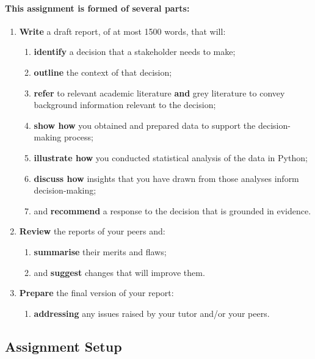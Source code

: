 \documentclass{../../fal_assignment}
\begin{document}
\paragraph{
This assignment is formed of several parts:
}

\begin{enumerate}[label=(\Alph*)]
    \item \textbf{Write} a draft report, of at most 1500 words, that will:
    	\begin{enumerate}[label=(\roman*)]
    		\item \textbf{identify} a decision that a stakeholder needs to make;
    		\item \textbf{outline} the context of that decision;
    		\item \textbf{refer} to relevant academic literature \textbf{and} grey literature to convey background information relevant to the decision;
    		\item \textbf{show how} you obtained and prepared data to support the decision-making process; 
    		\item \textbf{illustrate how} you conducted statistical analysis of the data in Python; 
    		\item \textbf{discuss how} insights that you have drawn from those analyses inform decision-making; 
    		\item and \textbf{recommend} a response to the decision that is grounded in evidence.
    	\end{enumerate}
	\item \textbf{Review} the reports of your peers and:
    	\begin{enumerate}[label=(\roman*)]
    		\item \textbf{summarise} their merits and flaws;
    		\item and \textbf{suggest} changes that will improve them.
    	\end{enumerate}
    \item \textbf{Prepare} the final version of your report:
    	\begin{enumerate}[label=(\roman*)]
    		\item \textbf{addressing} any issues raised by your tutor and/or your peers.
    	\end{enumerate}
\end{enumerate}

\subsection*{Assignment Setup}
\end{document}
